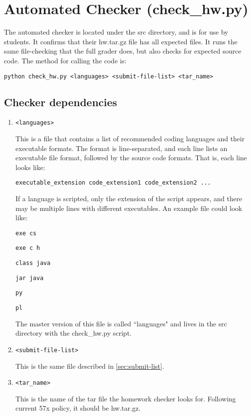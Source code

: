 \documentclass[12pt]{article}
\begin{document}
\section{Automated Checker (check\_hw.py)} \label{sec:checker}

The automated checker is located under the src directory, and is for use by students. It confirms that their hw.tar.gz file has all expected files. It runs the same file-checking that the full grader does, but also checks for expected source code. The method for calling the code is:

\texttt{python check\_hw.py <languages> <submit-file-list> <tar\_name>}

\subsection{Checker dependencies}

\begin{enumerate}
\item {\texttt{<languages>}

This is a file that contains a list of recommended coding languages and their executable formats. The format is line-separated, and each line lists an executable file format, followed by the source code formats. That is, each line looks like:

\texttt{executable\_extension code\_extension1 code\_extension2 ...}

If a language is scripted, only the extension of the script appears, and there may be multiple lines with different executables. An example file could look like:

\vspace{5pt}

\texttt{exe cs}

\texttt{exe c h}

\texttt{class java}

\texttt{jar java}

\texttt{py}

\texttt{pl}

\vspace{5pt}

The master version of this file is called ``languages" and lives in the src directory with the check\_hw.py script.

}
\item {\texttt{<submit-file-list>}

This is the same file described in \ref{sec:submit-list}.

}
\item {\texttt{<tar\_name>}

This is the name of the tar file the homework checker looks for. Following current 57x policy, it should be hw.tar.gz.
}
\end{enumerate}
\end{document}
